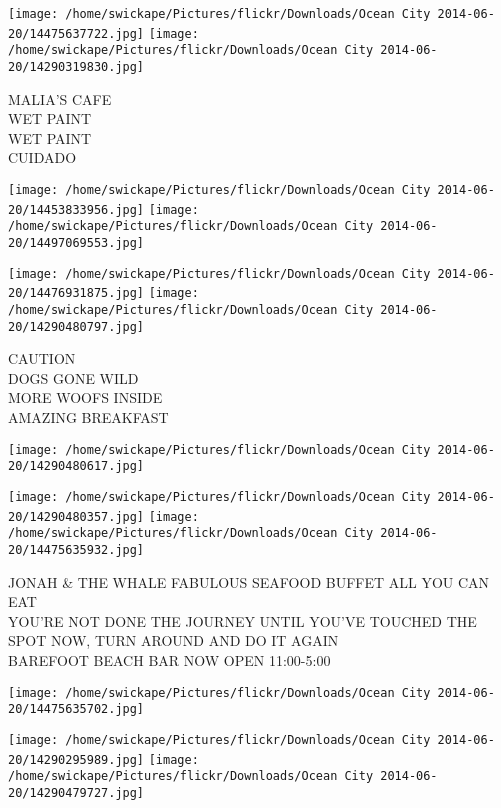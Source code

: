 \documentclass[10pt,letterpaper]{article}
\begin{document}
\texttt{[image: /home/swickape/Pictures/flickr/Downloads/Ocean City 2014-06-20/14475637722.jpg]}
\texttt{[image: /home/swickape/Pictures/flickr/Downloads/Ocean City 2014-06-20/14290319830.jpg]}

MALIA'S CAFE\\
WET PAINT\\
WET PAINT\\
CUIDADO\\
\pagebreak

\texttt{[image: /home/swickape/Pictures/flickr/Downloads/Ocean City 2014-06-20/14453833956.jpg]}
\texttt{[image: /home/swickape/Pictures/flickr/Downloads/Ocean City 2014-06-20/14497069553.jpg]}

\texttt{[image: /home/swickape/Pictures/flickr/Downloads/Ocean City 2014-06-20/14476931875.jpg]}
\texttt{[image: /home/swickape/Pictures/flickr/Downloads/Ocean City 2014-06-20/14290480797.jpg]}

CAUTION\\
DOGS GONE WILD\\
MORE WOOFS INSIDE\\
AMAZING BREAKFAST\\
\pagebreak

\texttt{[image: /home/swickape/Pictures/flickr/Downloads/Ocean City 2014-06-20/14290480617.jpg]}

\vspace{0.25in}
\texttt{[image: /home/swickape/Pictures/flickr/Downloads/Ocean City 2014-06-20/14290480357.jpg]}
\texttt{[image: /home/swickape/Pictures/flickr/Downloads/Ocean City 2014-06-20/14475635932.jpg]}

JONAH \& THE WHALE FABULOUS SEAFOOD BUFFET ALL YOU CAN EAT\\
YOU'RE NOT DONE THE JOURNEY UNTIL YOU'VE TOUCHED THE SPOT NOW, TURN AROUND AND DO IT AGAIN\\
BAREFOOT BEACH BAR NOW OPEN 11:00{-}5:00\\
\pagebreak

\texttt{[image: /home/swickape/Pictures/flickr/Downloads/Ocean City 2014-06-20/14475635702.jpg]}

\vspace{0.25in}
\texttt{[image: /home/swickape/Pictures/flickr/Downloads/Ocean City 2014-06-20/14290295989.jpg]}
\texttt{[image: /home/swickape/Pictures/flickr/Downloads/Ocean City 2014-06-20/14290479727.jpg]}
\end{document}
